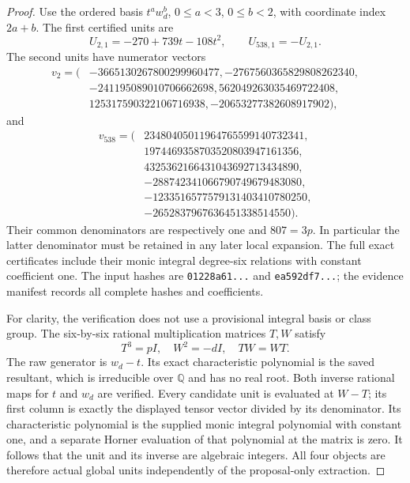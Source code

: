 \begin{proof}
Use the ordered basis $t^a w_d^b$, $0\le a<3$, $0\le b<2$,
with coordinate index $2a+b$.
The first certified units are
\[
 U_{2,1}=-270+739t-108t^2,\qquad U_{538,1}=-U_{2,1}.
 \tag{G150C.7}
\]
The second units have numerator vectors
\[
 \begin{split}
 v_2=(&-3665130267800299960477,-2767560365829808262340,\\
      &-241195089010706662698,562049263035469722408,\\
      &125317590322106716938,-20653277382608917902),
 \end{split}
 \tag{G150C.8}
\]
and
\[
 \begin{split}
 v_{538}=(&23480405011964765599140732341,\\
          &1974469358703520803947161356,\\
          &4325362166431043692713434890,\\
          &-288742341066790749679483080,\\
          &-1233516577579131403410780250,\\
          &-2652837967636451338514550).
 \end{split}
 \tag{G150C.9}
\]
Their common denominators are respectively one and $807=3p$.
In particular the latter denominator must be retained in any
later local expansion.
The full exact certificates include their monic integral
degree-six relations with constant coefficient one.
The input hashes are \texttt{01228a61...} and \texttt{ea592df7...};
the evidence manifest records all complete hashes and coefficients.

For clarity, the verification does not use a provisional integral
basis or class group.  The six-by-six rational multiplication
matrices $T,W$ satisfy
\[
              T^3=pI,\quad W^2=-dI,\quad TW=WT.
 \tag{G150C.10}
\]
The raw generator is $w_d-t$.
Its exact characteristic polynomial is the saved resultant,
which is irreducible over $\mathbb Q$ and has no real root.
Both inverse rational maps for $t$ and $w_d$ are verified.
Every candidate unit is evaluated at $W-T$; its first column
is exactly the displayed tensor vector divided by its denominator.
Its characteristic polynomial is the supplied monic integral
polynomial with constant one, and a separate Horner evaluation
of that polynomial at the matrix is zero.
It follows that the unit and its inverse are algebraic integers.
All four objects are therefore actual global units independently
of the proposal-only extraction.


\end{proof}
